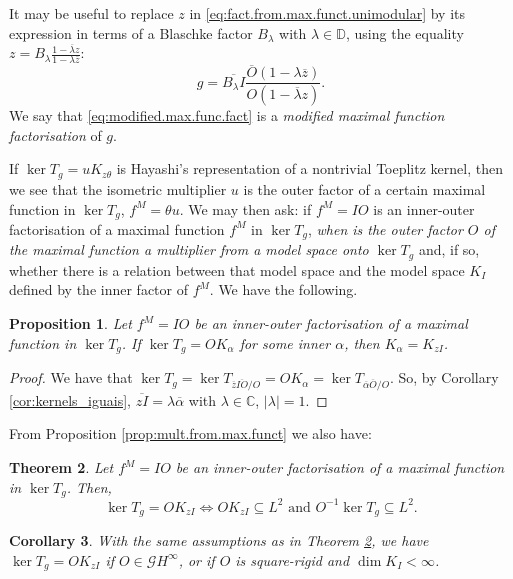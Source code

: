 \documentclass[12pt]{elsarticle}
\numberwithin{equation}{section}
\theoremstyle{plain}
\newtheorem{thm}{Theorem}[section]
\newtheorem{prop}[thm]{Proposition}
\newtheorem{cor}[thm]{Corollary}
\newcommand{\Hinf}{\ensuremath{H^\infty}}
\newcommand{\DD}{\ensuremath{\mathbb{D}}}
\newcommand{\CC}{\ensuremath{\mathbb{C}}}
\newcommand{\GG}{\ensuremath{\mathcal{G}}}
\newcommand{\ol}[1]{\ensuremath{\overline{#1}}}
\renewcommand{\subset}{\subseteq}
\begin{document}
It may be useful to replace $z$ in \eqref{eq:fact.from.max.funct.unimodular} by its expression in terms of a Blaschke factor $B_\lambda$ with $\lambda\in\DD$, using the equality $z = B_\lambda \frac{1-\ol\lambda z}{1 - \lambda \ol z}$:
\begin{equation}
\label{eq:modified.max.func.fact}
g = \ol{B_\lambda I} \frac{\ol O (1- \lambda \ol z)}{O (1-\ol\lambda z)}.
\end{equation}
We say that \eqref{eq:modified.max.func.fact} is a {\em modified maximal function factorisation} of $g$.

\vspace{8pt}

If $\ker T_g = u K_{z\theta}$ is Hayashi's representation of a nontrivial Toeplitz kernel, then we see that the isometric multiplier $u$ is the outer factor of a certain maximal function in $\ker T_g$, $f^M = \theta u$.
We may then ask: if $f^M = IO$ is an inner-outer factorisation of a maximal function $f^M$ in $\ker T_g$, {\em when is the outer factor $O$ of the maximal function a multiplier from a model space onto $\ker T_g$} and, if so, whether there is a relation between that model space and the model space $K_I$ defined by the inner factor of $f^M$.
We have the following.


\begin{prop}
\label{prop:model.space.from.maximal.function}
Let $f^M=IO$ be an inner-outer factorisation of a maximal function in $\ker T_g$.
If $\ker T_g = O K_\alpha$ for some inner $\alpha$, then $K_\alpha = K_{zI}$.
\end{prop}

\begin{proof}
We have that $\ker T_g = \ker T_{\ol z \ol{I O} / O} = O K_\alpha = \ker T_{\ol\alpha \ol O /O}$.
So, by Corollary \ref{cor:kernels_iguais}, $\ol{zI} = \lambda \ol\alpha$ with $\lambda\in\CC$, $|\lambda|=1$.
\end{proof}


From Proposition \ref{prop:mult.from.max.funct} we also have:

\begin{thm}
\label{thm:multiplier.from.maximal.function}
Let $f^M=IO$ be an inner-outer factorisation of a maximal function in $\ker T_g$.
Then,
\[
\ker T_g = O K_{zI} \iff O K_{zI} \subset L^2 \text{ and } O^{-1} \ker T_g \subset L^2.
\]
\end{thm}


\begin{cor}
\label{cor:invertible.O_or_I.FBP_give.multiplier}
With the same assumptions as in Theorem \ref{thm:multiplier.from.maximal.function}, we have $\ker T_g = O K_{zI}$ if $O\in\GG\Hinf$, or if $O$ is square-rigid and $\dim K_I < \infty$.

\end{cor}
\end{document}
